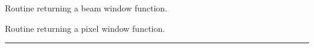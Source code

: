 
\begin{related}
  \begin{sulist}{} %
  \item[\htmlref{generate\_beam}{sub:generate_beam}] Routine returning a beam
  window function.
  \item[\htmlref{pixel\_window}{sub:pixel_window}] Routine returning a pixel
  window function.
  \end{sulist}
\end{related}

\rule{\hsize}{2mm}

\newpage
